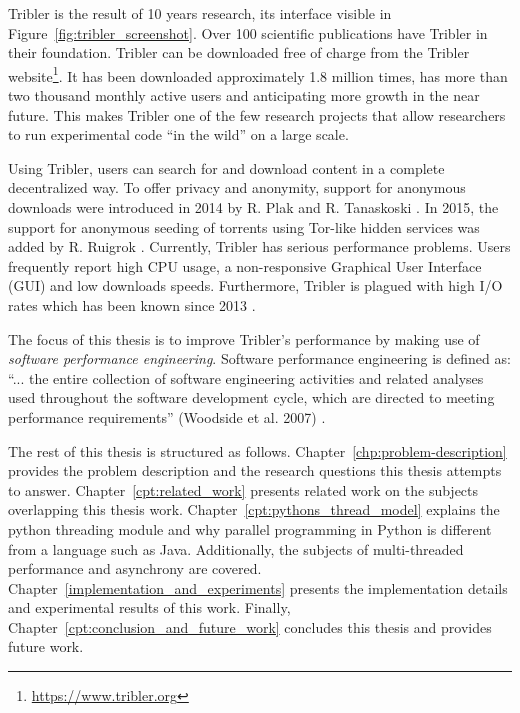 Tribler is the result of 10 years research, its interface visible in Figure~\ref{fig:tribler_screenshot}.
Over 100 scientific publications have Tribler in their foundation.
Tribler can be downloaded free of charge from the Tribler website\footnote{\url{https://www.tribler.org}}.
It has been downloaded approximately 1.8 million times, has more than two thousand  monthly active users and anticipating more growth in the near future.
This makes Tribler one of the few research projects that allow researchers to run experimental code \enquote{in the wild} on a large scale.

Using Tribler, users can search for and download content in a complete decentralized way.
To offer privacy and anonymity, support for anonymous downloads were introduced in 2014 by R. Plak \cite{plak2014anonymous} and R. Tanaskoski \cite{tanaskoski2014anonymous}.
In 2015, the support for anonymous seeding of torrents using Tor-like hidden services was added by R. Ruigrok \cite{ruigrok2015bittorrent}.
Currently, Tribler has serious performance problems.
Users frequently report high CPU usage, a non-responsive Graphical User Interface (GUI) and low downloads speeds.
Furthermore, Tribler is plagued with high I/O rates which has been known since 2013 \cite{pouwelse2014reduce}. 

The focus of this thesis is to improve Tribler's performance by making use of \emph{software performance engineering}.
Software performance engineering is defined as: \enquote{... the entire collection of software engineering activities and related analyses used throughout the software development cycle, which are directed to meeting performance requirements} (Woodside et al. 2007) \cite{woodside2007future}.

The rest of this thesis is structured as follows.
Chapter~\ref{chp:problem-description} provides the problem description and the research questions this thesis attempts to answer.
Chapter~\ref{cpt:related_work} presents related work on the subjects overlapping this thesis work.
Chapter~\ref{cpt:pythons_thread_model} explains the python threading module and why parallel programming in Python is different from a language such as Java. Additionally, the subjects of multi-threaded performance and asynchrony are covered.
Chapter~\ref{implementation_and_experiments} presents the implementation details and experimental results of this work.
Finally, Chapter~\ref{cpt:conclusion_and_future_work} concludes this thesis and provides future work.

